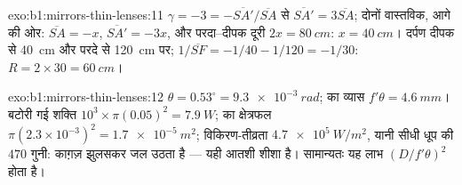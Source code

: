 \begin{solution}{exo:b1:mirrors-thin-lenses:11}
$\gamma = -3 = -\overline{SA'}/\overline{SA}$ से $\overline{SA'} =
3\overline{SA}$; दोनों वास्तविक, आगे की ओर: $\overline{SA} = -x$,
$\overline{SA'} = -3x$, और परदा--दीपक दूरी $2x = \qty{80}{cm}$:
$x = \qty{40}{cm}$। दर्पण दीपक से \qty{40}{cm} और परदे से \qty{120}{cm}
पर; $1/\overline{SF} = -1/40 - 1/120 = -1/30$:
$R = 2 \times 30 = \qty{60}{cm}$।
\end{solution}

\begin{solution}{exo:b1:mirrors-thin-lenses:12}
$\theta = 0.53^\circ = \qty{9.3e-3}{rad}$;  का व्यास $f'\theta =
\qty{4.6}{mm}$। बटोरी गई शक्ति $10^3 \times \pi(0.05)^2 = \qty{7.9}{W}$;
 का क्षेत्रफल $\pi(2.3\times10^{-3})^2 = \qty{1.7e-5}{m^2}$; विकिरण-तीव्रता
$\qty{4.7e5}{W/m^2}$, यानी सीधी धूप की $470$ गुनी: काग़ज़ झुलसकर
जल उठता है --- यही आतशी शीशा है। सामान्यतः यह लाभ
$(D/f'\theta)^2$ होता है।
\end{solution}


